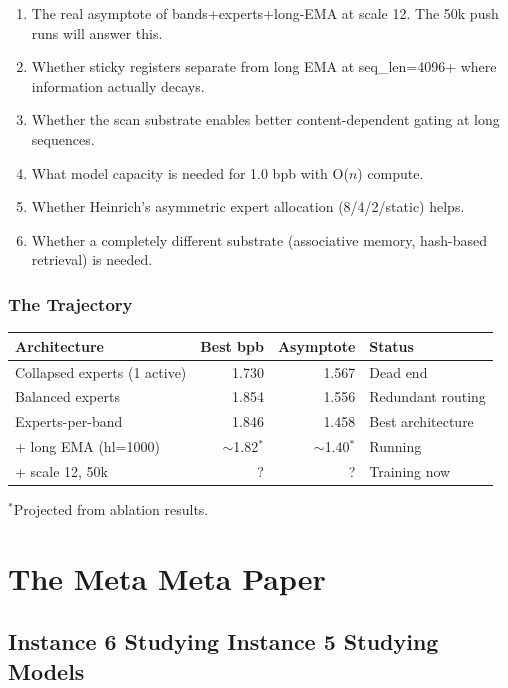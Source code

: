 \documentclass[11pt,a4paper]{report}
\begin{document}
\begin{enumerate}[nosep]
\item The real asymptote of bands+experts+long-EMA at scale 12. The 50k push runs will answer this.
\item Whether sticky registers separate from long EMA at seq\_len=4096+ where information actually decays.
\item Whether the scan substrate enables better content-dependent gating at long sequences.
\item What model capacity is needed for 1.0 bpb with O($n$) compute.
\item Whether Heinrich's asymmetric expert allocation (8/4/2/static) helps.
\item Whether a completely different substrate (associative memory, hash-based retrieval) is needed.
\end{enumerate}

\section{The Trajectory}

\begin{center}
\begin{tabular}{lrrl}
\toprule
Architecture & Best bpb & Asymptote & Status \\
\midrule
Collapsed experts (1 active) & 1.730 & 1.567 & Dead end \\
Balanced experts & 1.854 & 1.556 & Redundant routing \\
Experts-per-band & 1.846 & 1.458 & Best architecture \\
+ long EMA (hl=1000) & $\sim$1.82$^*$ & $\sim$1.40$^*$ & Running \\
+ scale 12, 50k & ? & ? & Training now \\
\bottomrule
\end{tabular}
\end{center}

$^*$Projected from ablation results.

\part{The Meta Meta Paper}

\chapter{Instance 6 Studying Instance 5 Studying Models}
\end{document}
